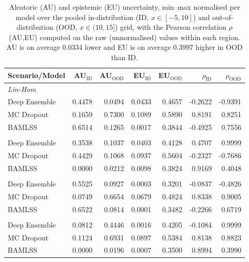 \begin{table}
\centering
\small
\setlength{\tabcolsep}{4pt}
\caption{Aleatoric (AU) and epistemic (EU) uncertainty, min--max normalised per model over the pooled in-distribution (ID, $x\in[-5,10]$) and out-of-distribution (OOD, $x\in(10,15]$) grid, with the Pearson correlation $\rho$(AU,EU) computed on the raw (unnormalised) values within each region. AU is on average 0.0334 lower and EU is on average 0.3997 higher in OOD than ID.}
\label{tab:ood}
\begin{tabular}{lrrrrrr}
\toprule
Scenario/Model & AU$_{\text{ID}}$ & AU$_{\text{OOD}}$ & EU$_{\text{ID}}$ & EU$_{\text{OOD}}$ & $\rho_{\text{ID}}$ & $\rho_{\text{OOD}}$ \\
\midrule
\multicolumn{7}{l}{\textit{Lin-Hom}} \\
Deep Ensemble & 0.4478 & 0.0494 & 0.0433 & 0.4657 & -0.2622 & -0.9391 \\
MC Dropout & 0.1659 & 0.7300 & 0.1089 & 0.5890 & 0.8191 & 0.8251 \\
BAMLSS & 0.6514 & 0.1265 & 0.0017 & 0.3844 & -0.4925 & 0.7556 \\
\addlinespace
\multicolumn{7}{l}{\textit{Lin-Het}} \\
Deep Ensemble & 0.3538 & 0.1037 & 0.0403 & 0.4128 & 0.4707 & 0.9999 \\
MC Dropout & 0.4429 & 0.1068 & 0.0937 & 0.5604 & -0.2327 & -0.7686 \\
BAMLSS & 0.0000 & 0.0212 & 0.0098 & 0.3824 & 0.9169 & 0.4048 \\
\addlinespace
\multicolumn{7}{l}{\textit{Sin-Hom}} \\
Deep Ensemble & 0.5525 & 0.0927 & 0.0003 & 0.3201 & -0.0837 & -0.4826 \\
MC Dropout & 0.0749 & 0.6654 & 0.0679 & 0.4824 & 0.8338 & 0.9005 \\
BAMLSS & 0.6522 & 0.0814 & 0.0001 & 0.3482 & -0.2266 & 0.6719 \\
\addlinespace
\multicolumn{7}{l}{\textit{Sin-Het}} \\
Deep Ensemble & 0.0812 & 0.4446 & 0.0016 & 0.4205 & -0.1084 & 0.9999 \\
MC Dropout & 0.1124 & 0.6931 & 0.0897 & 0.5384 & 0.8138 & 0.8823 \\
BAMLSS & 0.0000 & 0.0196 & 0.0007 & 0.3500 & 0.8994 & 0.3990 \\
\bottomrule
\end{tabular}
\end{table}
